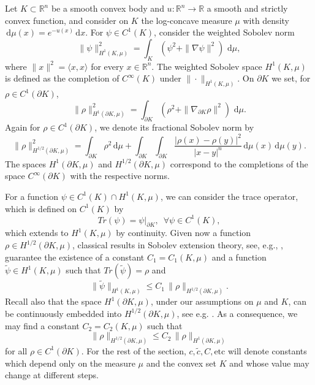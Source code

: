 \documentclass[a4paper, 11pt]{article}
\newcommand{\R}{\mathbb{R}}
\theoremstyle{definition}
\newcommand{\di}{\, \mathrm{d}}
\begin{document}
Let $K \subset \mathbb{R}^n$ be a smooth convex body and $u:\R^n \to \R$ a smooth and strictly convex function, and consider on $K$ the log-concave measure $\mu$ with density $\di \mu(x)=e^{-u(x)}\di x$. For $\psi \in C^1(K)$, consider the weighted Sobolev norm
\[
\|\psi\|_{H^{1}(K,\mu)}^{2}
  = \int_{K} \left(\psi^{2} + \|\nabla\psi\|^{2}\right)\, \di\mu,
\]
where $\|x \|^2=\langle x, x \rangle$ for every $x \in \R^n$. The weighted Sobolev space $H^{1}(K,\mu)$ is defined as the completion of $C^{\infty}(K)$ under $\|\cdot\|_{H^{1}(K,\mu)}$. On $\partial K$ we set, for $\rho \in C^{1}(\partial K)$,
\[
\|\rho\|_{H^{1}(\partial K,\mu)}^{2}
   = \int_{\partial K}\left(\rho^{2} + \|\nabla_{\partial K}\rho\|^{2}\right)\, \di\mu.
\]
Again for $\rho \in C^{1}(\partial K)$,  we denote its fractional Sobolev norm by
\begin{equation}\label{eq:Fractional Sobolev norm}
\|\rho\|^2_{H^{1/2}(\partial K,\mu)}
   = \int_{\partial K}\rho^2 \di \mu+\int_{\partial K}\!\int_{\partial K}
    \frac{|\rho(x)-\rho(y)|^{2}}{|x-y|^{n}}
    \di \mu(x) \di\mu(y).
\end{equation}
The spaces $H^{1}(\partial K,\mu)$ and $H^{1/2}(\partial K,\mu)$ correspond to the completions of the space $C^{\infty}(\partial K)$ with the respective norms. 

For a function $\psi \in C^{1}(K)\cap H^{1}(K,\mu)$, we can consider the trace operator, which is defined on $C^{1}(K)$ by
\[Tr(\psi) = \psi |_{\partial K}, \,\,\, \forall \psi \in C^{1}(K),\]
which extends to $H^{1}(K,\mu)$ by continuity. Given now a function $\rho \in H^{1/2}(\partial K,\mu)$, classical results in Sobolev extension theory, see, e.g., \cite[Th. 18.40]{LeoniBook}, guarantee the existence of a constant $C_{1}=C_{1}(K,\mu)$ and a function $\tilde{\psi} \in H^{1}(K,\mu)$ such that $Tr\left(\tilde{\psi}\right) = \rho $ and
\begin{equation}\label{eq:fractional_extension}
\|\tilde{\psi}\|_{H^{1}(K,\mu)} \leq C_{1} \,\|\rho\|_{H^{1/2}(\partial K,\mu)}.     
\end{equation}
Recall also that the space $H^{1}(\partial K,\mu)$, under our assumptions on $\mu$ and $K$, can be continuously embedded into  $H^{1/2}(\partial K,\mu)$, see e.g. \cite[Th.6.2]{SobBook}. As a consequence, we may find a constant $C_{2} = C_{2}(K,\mu)$ such that
\begin{equation}\label{eq:frac_boundary_embedding}
     \|\rho\|_{H^{1/2}(\partial K,\mu)}
     \le C_2\,\|\rho\|_{H^{1}(\partial K,\mu)}
\end{equation}
for all $\rho \in C^1(\partial K)$. For the rest of the section, $c,\tilde{c},C,\text{etc}$ will denote constants which depend only on the measure $\mu$ and the convex set $K$ and whose value may change at different steps. 
\end{document}
